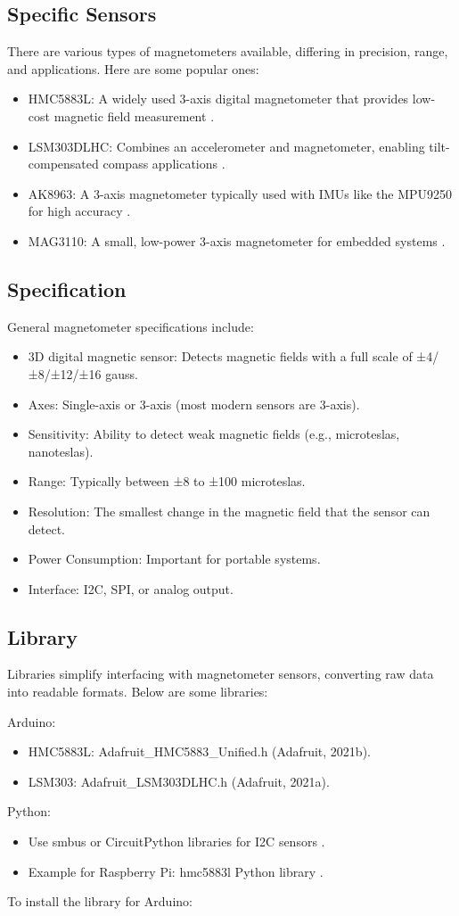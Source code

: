 \subsection{Specific Sensors}
There are various types of magnetometers available, differing in precision, range, and applications. Here are some popular ones:
\begin{itemize}
	\item HMC5883L: A widely used 3-axis digital magnetometer that provides low-cost magnetic field measurement \cite{Honeywell:2012}.
	\item LSM303DLHC: Combines an accelerometer and magnetometer, enabling tilt-compensated compass applications \cite{Adafruit:2021a}.
	\item AK8963: A 3-axis magnetometer typically used with IMUs like the MPU9250 for high accuracy \cite{AsahiKasei:2014}.
	\item MAG3110: A small, low-power 3-axis magnetometer for embedded systems \cite{NXP:2013}.
\end{itemize}
\subsection{Specification}

General magnetometer specifications include:
\begin{itemize}
	\item 3D digital magnetic sensor: Detects magnetic fields with a full scale of ±4/±8/±12/±16 gauss.
	\item Axes: Single-axis or 3-axis (most modern sensors are 3-axis).
	\item Sensitivity: Ability to detect weak magnetic fields (e.g., microteslas, nanoteslas).
	\item Range: Typically between ±8 to ±100 microteslas.
	\item Resolution: The smallest change in the magnetic field that the sensor can detect.
	\item Power Consumption: Important for portable systems.
\item Interface: I2C, SPI, or analog output.
\end{itemize}
\subsection{Library}
Libraries simplify interfacing with magnetometer sensors, converting raw data into readable formats. Below are some libraries:

Arduino:
\begin{itemize}
	\item HMC5883L: Adafruit\_HMC5883\_Unified.h (Adafruit, 2021b).
	\item LSM303: Adafruit\_LSM303DLHC.h (Adafruit, 2021a).
\end{itemize}
Python:
\begin{itemize}
	\item Use smbus or CircuitPython libraries for I2C sensors \cite{Adafruit:2020}.
	\item Example for Raspberry Pi: hmc5883l Python library \cite{Hollingworth:2019}.
\end{itemize}
To install the library for Arduino:

